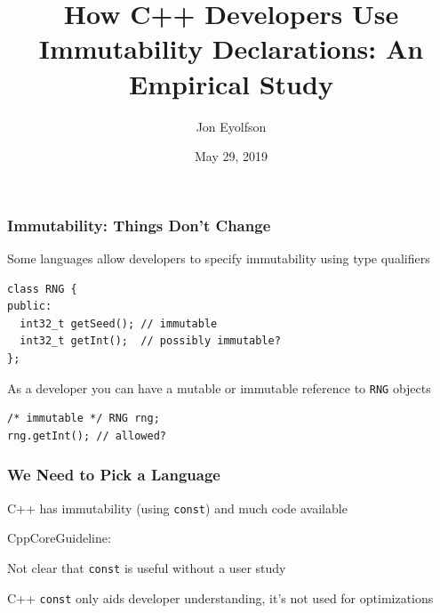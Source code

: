 \documentclass[aspectratio=169]{beamer}
\title{How C++ Developers Use Immutability Declarations: An Empirical Study}
\date{May 29, 2019}
\author{Jon Eyolfson}
\begin{document}
  \begin{frame}[plain]
    \titlepage
  \end{frame}

  \setcounter{framenumber}{0}

  \begin{frame}[fragile]
    \frametitle{Immutability: Things Don't Change}

    Some languages allow developers to specify immutability using type
    qualifiers
    \begin{lstlisting}[xleftmargin=1cm]
class RNG {
public:
  int32_t getSeed(); // immutable
  int32_t getInt();  // possibly immutable?
};
    \end{lstlisting}

    As a developer you can have a mutable or immutable reference to \texttt{RNG}
    objects

    \begin{lstlisting}[xleftmargin=1cm]
/* immutable */ RNG rng;
rng.getInt(); // allowed?
    \end{lstlisting}

    \vspace{2em}

  \end{frame}

  \begin{frame}
    \frametitle{We Need to Pick a Language}

    C++ has immutability (using \texttt{const}) and much code available

    \vspace{1em}

    \hspace{1em} CppCoreGuideline: 

    \vspace{4em}

    Not clear that \texttt{const} is useful without a user study

    \vspace{1em}

    \hspace{1em} C++ \texttt{const} only aids developer understanding,
    it's not used for optimizations
  \end{frame}
\end{document}
